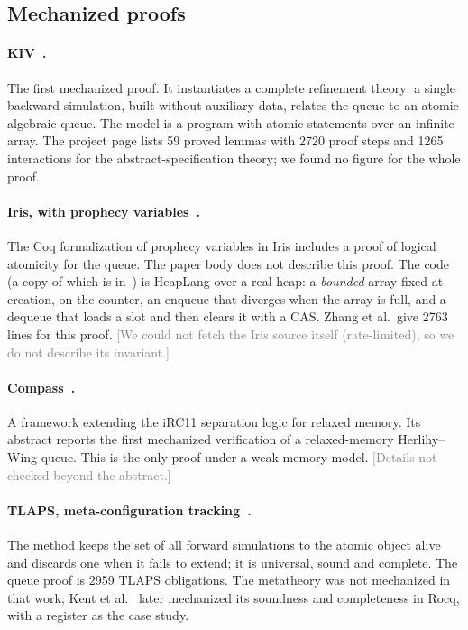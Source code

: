 \documentclass[11pt]{article}
\newcommand{\code}[1]{\texttt{\detokenize{#1}}}
\newcommand{\unverified}[1]{\textcolor{gray}{[#1]}}
\begin{document}
\subsection{Mechanized proofs}

\paragraph{KIV~\cite{SWD12,SDW14}.}
The first mechanized proof.  It instantiates a complete refinement theory:
a single backward simulation, built without auxiliary data, relates the
queue to an atomic algebraic queue.  The model is a program with atomic
statements over an infinite array.  The project page lists 59 proved lemmas
with 2720 proof steps and 1265 interactions for the abstract-specification
theory; we found no figure for the whole proof.

\paragraph{Iris, with prophecy variables~\cite{Jung20}.}
The Coq formalization of prophecy variables in Iris includes a proof of
logical atomicity for the queue.  The paper body does not describe this
proof.  The code (a copy of which is in~\cite{ZGT26}) is HeapLang over a
real heap: a \emph{bounded} array fixed at creation, \code{FAA} on the
counter, an enqueue that diverges when the array is full, and a dequeue that
loads a slot and then clears it with a CAS.  Zhang et al.\ give 2763 lines
for this proof.  \unverified{We could not fetch the Iris source itself
(rate-limited), so we do not describe its invariant.}

\paragraph{Compass~\cite{Compass22}.}
A framework extending the iRC11 separation logic for relaxed memory.  Its
abstract reports the first mechanized verification of a relaxed-memory
Herlihy--Wing queue.  This is the only proof under a weak memory model.
\unverified{Details not checked beyond the abstract.}

\paragraph{TLAPS, meta-configuration tracking~\cite{JJYH24}.}
The method keeps the set of all forward simulations to the atomic object
alive and discards one when it fails to extend; it is universal, sound and
complete.  The queue proof is 2959 TLAPS obligations.  The metatheory was
not mechanized in that work; Kent et al.~\cite{KYJBB25} later mechanized
its soundness and completeness in Rocq, with a register as the case study.
\end{document}
